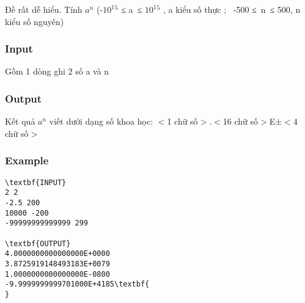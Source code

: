 

Đề rất dễ hiểu. Tính $a^{n}$ (-$10^{1}$$^ 5 $ ≤ a ≤ $10^{1}$$^ 5 $ , a kiểu số thực ;  -500 ≤ n ≤ 500, n kiểu số nguyên)

\subsubsection{Input}

Gồm 1 dòng ghi 2 số a và n

\subsubsection{Output}

Kết quả $a^{n}$ viết dưới dạng số khoa học: $<$1 chữ số$>$.$<$16 chữ số$>$E±$<$4 chữ số$>$

\subsubsection{Example}
\begin{verbatim}
\textbf{INPUT}
2 2
-2.5 200
10000 -200
-99999999999999 299

\textbf{OUTPUT}
4.0000000000000000E+0000
3.8725919148493183E+0079
1.0000000000000000E-0800
-9.9999999999701000E+4185\textbf{        
}\end{verbatim}
